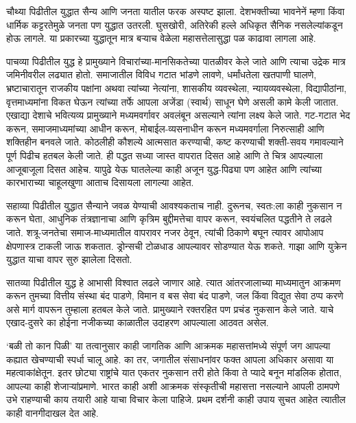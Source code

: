 चौथ्या पिढीतील युद्धात सैन्य आणि जनता यातील फरक अस्पष्ट झाला. देशभक्तीच्या भावनेनें म्हणा किंवा धार्मिक कट्टरतेमुळे जनता पण युद्धात उतरली. घुसखोरी, अतिरेकी हल्ले अधिकृत सैनिक नसलेल्यांकडून होऊ लागले. या प्रकारच्या युद्धातून मात्र बऱ्याच वेळेला महासत्तेलासुद्धा पळ काढावा लागला आहे.

पाचव्या पिढीतील युद्ध हे प्रामुख्याने विचारांच्या-मानसिकतेच्या पातळीवर केले जाते आणि त्याचा उद्रेक मात्र जमिनीवरील लढ्यात होतो. समाजातील विविध गटात भांडणे लावणे, धर्मांधतेला खतपाणी घालणे, भ्रष्टाचारातून राजकीय पक्षांना अथवा त्यांच्या नेत्यांना, शासकीय व्यवस्थेला, न्यायव्यवस्थेला, विद्यापीठांना, वृत्तमाध्यमांना विकत घेऊन त्यांच्या तर्फे आपला अजेंडा (स्वार्थ) साधून घेणे असली कामे केली जातात. एखाद्या देशाचे भवित्यव्य प्रामुख्याने मध्यमवर्गावर अवलंबून असल्याने त्यांना लक्ष्य केले जाते. गट-गटात भेद करून, समाजमाध्यमांच्या आधीन करून, मोबाईल-व्यसनाधीन करून मध्यमवर्गाला निरुत्साही आणि शक्तिहीन बनवले जाते. कोठलीही कौशल्ये आत्मसात करण्याची, कष्ट करण्याची शक्ती-सवय गमावल्याने पूर्ण पिढीच हतबल केली जाते. ही पद्धत सध्या जास्त वापरात दिसत आहे आणि ते चित्र आपल्याला आजूबाजूला दिसत आहेच. यापुढे येऊ घातलेल्या काही अजून युद्ध-पिढ्या पण आहेत आणि त्यांच्या कारभाराच्या चाहूलखुणा आताच दिसायला लागल्या आहेत.

सहाव्या पिढीतील युद्धात सैन्याने जवळ येण्याची आवश्यकताच नाही. दुरूनच, स्वतः:ला काही नुकसान न करून घेता, आधुनिक तंत्रज्ञानाचा आणि कृत्रिम बुद्दीमत्तेचा वापर करून, स्वयंचलित पद्धतीने ते लढले जाते. शत्रू-जनतेचा समाज-माध्यमातील वापरावर नजर ठेवून, त्यांची ठिकाणे बघून त्यावर आपोआप क्षेपणास्त्र टाकली जाऊ शकतात. ड्रोन्सची टोळधाड आपल्यावर सोडण्यात येऊ शकते. गाझा आणि युक्रेन युद्धात याचा वापर सुरु झालेला दिसतो.

सातव्या पिढीतील युद्ध हे आभासी विश्वात लढले जाणार आहे. त्यात आंतरजालाच्या माध्यमातुन आक्रमण करून तुमच्या वित्तीय संस्था बंद पाडणे, विमान व बस सेवा बंद पाडणे, जल किंवा विद्युत सेवा ठप्प करणे असे मार्ग वापरून तुम्हाला हतबल केले जाते. प्रामुख्याने रक्तरहित पण प्रचंड नुकसान केले जाते. याचे एखाद-दुसरे का होईना नजीकच्या काळातील उदाहरण आपल्याला आठवत असेल.

`बळी तो कान पिळी' या तत्वानुसार काही जागतिक आणि आक्रमक महासत्तांमध्ये संपूर्ण जग आपल्या कह्यात खेचण्याची स्पर्धा चालू आहे. का तर, जगातील संसाधनांवर फक्त आपला अधिकार असावा या महत्वाकांक्षेतून. इतर छोट्या राष्ट्रांचे यात एकतर नुकसान तरी होते किंवा ते प्यादे बनून मांडलिक होतात, आपल्या काही शेजाऱ्यांप्रमाणे. भारत काही अशी आक्रमक संस्कृतीची महासत्ता नसल्याने आपली ठामपणे उभे राहण्याची काय तयारी आहे याचा विचार केला पाहिजे. प्रथम दर्शनी काही उपाय सुचत आहेत त्यातील काही वानगीदाखल देत आहे.

